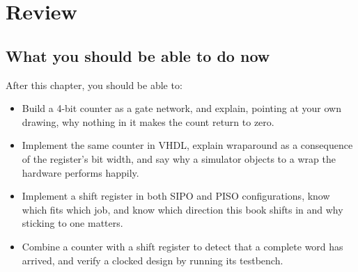 
\section{Review}
\label{c6:sec:review}

\subsection*{What you should be able to do now}
After this chapter, you should be able to:
\begin{itemize}
  \item Build a 4-bit counter as a gate network, and explain, pointing at your own drawing, why
    nothing in it makes the count return to zero.
  \item Implement the same counter in VHDL, explain wraparound as a consequence of the register's
    bit width, and say why a simulator objects to a wrap the hardware performs happily.
  \item Implement a shift register in both SIPO and PISO configurations, know which fits which
    job, and know which direction this book shifts in and why sticking to one matters.
  \item Combine a counter with a shift register to detect that a complete word has arrived, and
    verify a clocked design by running its testbench.
\end{itemize}

